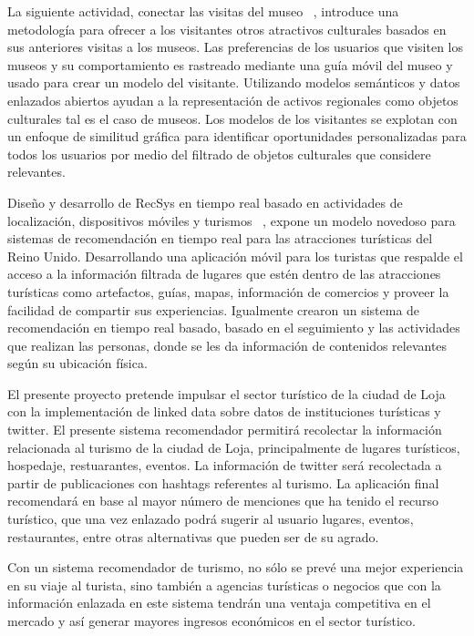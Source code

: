 \documentclass[lnbip,sechang,a4paper]{svmultln}
\begin{document}
La siguiente actividad, conectar las visitas del museo ~\cite{doceb}, introduce una metodología para ofrecer a los visitantes otros atractivos culturales basados en sus anteriores visitas a los museos. Las preferencias de los usuarios que visiten los museos y su comportamiento es rastreado mediante una guía móvil del museo y usado para crear un modelo del visitante. Utilizando modelos semánticos y datos enlazados abiertos ayudan a la representación de activos regionales como objetos culturales tal es el caso de museos. Los modelos de los visitantes se explotan con un enfoque de similitud gráfica para identificar oportunidades personalizadas para todos los usuarios por medio del filtrado de objetos culturales que considere relevantes.

Diseño y desarrollo de RecSys en tiempo real basado en actividades de localización, dispositivos móviles y turismos ~\cite{docec}, expone un modelo novedoso para sistemas de recomendación en tiempo real para las atracciones turísticas del Reino Unido. Desarrollando una aplicación móvil para los turistas que respalde el acceso a la información filtrada de lugares que estén dentro de las atracciones turísticas como artefactos, guías, mapas, información de comercios y proveer la facilidad de compartir sus experiencias. Igualmente crearon un sistema de recomendación en tiempo real basado, basado en el seguimiento y las actividades que realizan las personas, donde se les da información de contenidos relevantes según su ubicación física. 

El presente proyecto pretende impulsar el sector turístico de la ciudad de Loja con la implementación de linked data sobre datos de instituciones turísticas y twitter. El presente sistema recomendador permitirá recolectar la información relacionada al turismo de la ciudad de Loja, principalmente de lugares turísticos, hospedaje, restuarantes,  eventos. La información de twitter será recolectada a partir de publicaciones con hashtags referentes al turismo.  La aplicación final recomendará en base al mayor número de menciones que ha tenido el recurso turístico, que una vez enlazado podrá sugerir al usuario lugares, eventos, restaurantes, entre otras alternativas que pueden ser de su agrado.

Con un sistema recomendador de turismo, no sólo se prevé una mejor experiencia en su viaje al turista, sino también a agencias turísticas o negocios que con la información enlazada en este sistema tendrán una ventaja competitiva en el mercado y así generar mayores ingresos económicos en el sector turístico.
\end{document}
